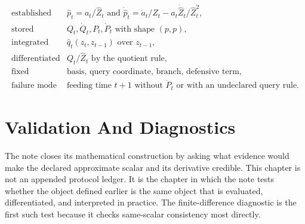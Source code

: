 \documentclass[11pt]{article}
\numberwithin{equation}{section}
\begin{document}
\begin{equation}
\begin{array}{ll}
\text{established} &
    \widehat p_t=a_t/\widehat Z_t
    \text{ and }
    \dot{\widehat p}_t=\dot a_t/\widehat Z_t
    -a_t\dot{\widehat Z}_t/\widehat Z_t^2,\\[1mm]
\text{stored} &
    Q_t,\dot Q_t,P_t,\dot P_t
    \text{ with shape }(p,p),\\[1mm]
\text{integrated} &
    \widehat q_t(z_t,z_{t-1}) \text{ over } z_{t-1},\\[1mm]
\text{differentiated} &
    Q_t/\widehat Z_t \text{ by the quotient rule},\\[1mm]
\text{fixed} &
    \text{basis, query coordinate, branch, defensive term},\\[1mm]
\text{failure mode} &
    \text{feeding time }t+1\text{ without }\dot P_t
    \text{ or with an undeclared query rule.}
\end{array}
\label{eq:p24-p22-r4}
\end{equation}

\appendix
\section{Validation And Diagnostics}

The note closes its mathematical construction by asking what evidence would make
the declared approximate scalar and its derivative credible.  This chapter is not
an appended protocol ledger.  It is the chapter in which the note tests whether
the object defined earlier is the same object that is evaluated, differentiated,
and interpreted in practice.  The finite-difference diagnostic is the first such
test because it checks same-scalar consistency most directly.
\end{document}
